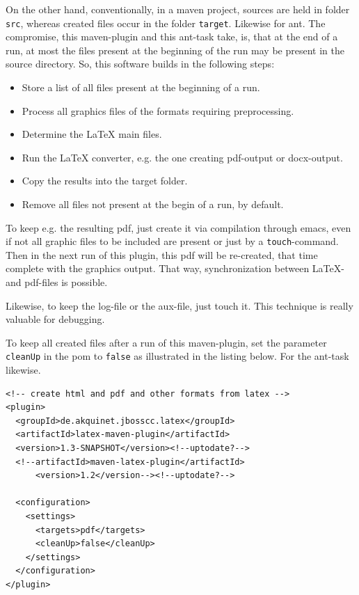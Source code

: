 \documentclass[12pt]{book}
\begin{document}
On the other hand, 
conventionally, in a maven project, 
sources are held in folder {\tt src}, 
whereas created files occur in the folder {\tt target}. 
Likewise for ant. 
The compromise, this maven-plugin and this ant-task take, 
is, that at the end of a run, 
at most the files present at the beginning of the run 
may be present in the source directory. 
So, this software builds in the following steps: 
%
\begin{itemize}
\item
Store a list of all files present at the beginning of a run.
\item
Process all graphics files of the formats requiring preprocessing.
\item
Determine the \LaTeX{} main files.
\item
Run the \LaTeX{} converter, e.g. the one creating pdf-output or docx-output.
\item
Copy the results into the target folder.
\item
Remove all files not present at the begin of a run, by default. 
\end{itemize}

To keep e.g. the resulting pdf, 
just create it via compilation through emacs, 
even if not all graphic files to be included are present 
or just by a {\tt touch}-command. 
Then in the next run of this plugin, 
this pdf will be re-created, 
that time complete with the graphics output. 
That way, synchronization between \LaTeX- and pdf-files is possible. 

Likewise, to keep the log-file or the aux-file, just touch it. 
This technique is really valuable for debugging. 

To keep all created files after a run of this maven-plugin, 
set the parameter {\tt cleanUp} in the pom 
to {\tt false} as illustrated in the listing below. 
For the ant-task likewise. 
%
\lstset{language=xml, basicstyle=\small}
\begin{lstlisting}
<!-- create html and pdf and other formats from latex -->
<plugin>
  <groupId>de.akquinet.jbosscc.latex</groupId>
  <artifactId>latex-maven-plugin</artifactId>
  <version>1.3-SNAPSHOT</version><!--uptodate?-->
  <!--artifactId>maven-latex-plugin</artifactId>
      <version>1.2</version--><!--uptodate?-->
	
  <configuration>
    <settings>
      <targets>pdf</targets>
      <cleanUp>false</cleanUp>
    </settings>
  </configuration>
</plugin>
\end{lstlisting}
\end{document}
